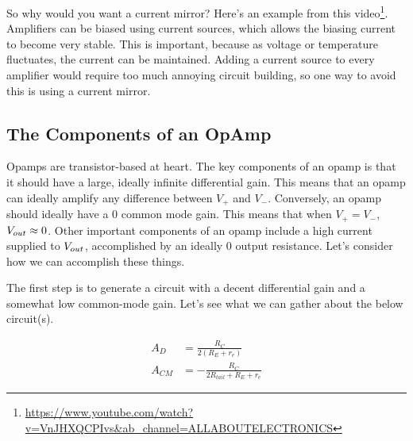 So why would you want a current mirror? Here's an example from this video\footnote{\url{https://www.youtube.com/watch?v=VnJHXQCPIvs\&ab_channel=ALLABOUTELECTRONICS}}. Amplifiers can be biased using current sources, which allows the biasing current to become very stable. This is important, because as voltage or temperature fluctuates, the current can be maintained. Adding a current source to every amplifier would require too much annoying circuit building, so one way to avoid this is using a current mirror. 

\subsection{The Components of an OpAmp}

Opamps are transistor-based at heart. The key components of an opamp is that it should have a large, ideally infinite differential gain. This means that an opamp can ideally amplify any difference between $V_+$ and $V_-$. Conversely, an opamp should ideally have a 0 common mode gain. This means that when $V_+ = V_-$, ${V}_{out} \approx 0$. Other important components of an opamp include a high current supplied to ${V}_{out}$, accomplished by an ideally 0 output resistance. Let's consider how we can accomplish these things.\newline

The first step is to generate a circuit with a decent differential gain and a somewhat low common-mode gain. Let's see what we can gather about the below circuit(s). 

\begin{equation}\label{sec:diffgain}
\begin{split}
    A_{D} &= \frac{R_C}{2(R_E + r_e)}\\
    A_{CM} &= -\frac{R_C}{2R_{tail} + R_E + r_e} 
\end{split}
\end{equation}



